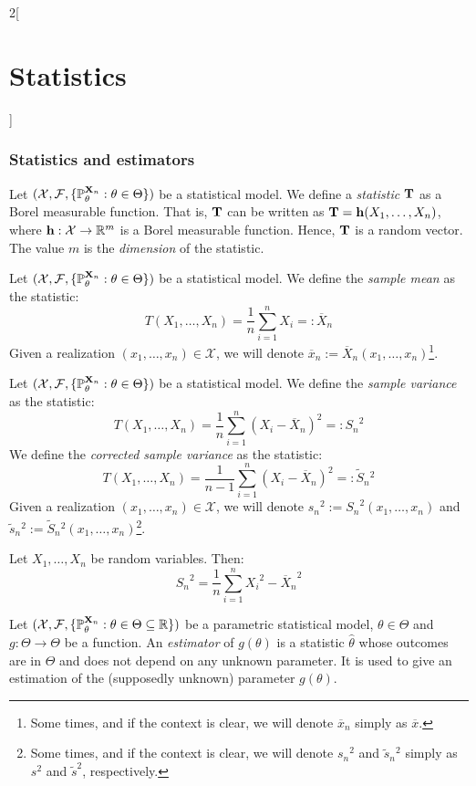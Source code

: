 \documentclass[../../../main_math.tex]{subfiles}
\begin{document}
\begin{multicols}{2}[\section{Statistics}]
  \subsubsection{Statistics and estimators}
  \begin{definition}[Statistic]
    Let $(\mathcal{X},\mathcal{F},\{\mathbb{P}_\theta^{\boldsymbol{\mathrm{X}}_n}:\theta\in\Theta\})$ be a statistical model. We define a \emph{statistic} $\boldsymbol{\mathrm{T}}$ as a Borel measurable function. That is, $\boldsymbol{\mathrm{T}}$ can be written as $\boldsymbol{\mathrm{T}}=\boldsymbol{\mathrm{h}}(X_1,\ldots,X_n)$, where $\boldsymbol{\mathrm{h}}:\mathcal{X}\rightarrow\mathbb{R}^m$ is a Borel measurable function. Hence, $\boldsymbol{\mathrm{T}}$ is a random vector. The value $m$ is the \emph{dimension} of the statistic.
  \end{definition}
  \begin{definition}
    Let $(\mathcal{X},\mathcal{F},\{\mathbb{P}_\theta^{\boldsymbol{\mathrm{X}}_n}:\theta\in\Theta\})$ be a statistical model. We define the \emph{sample mean} as the statistic: $$T(X_1,\ldots,X_n)=\frac{1}{n}\sum_{i=1}^nX_i=:\overline{X}_n$$
    Given a realization $(x_1,\ldots,x_n)\in\mathcal{X}$, we will denote $\overline{x}_n:=\overline{X}_n(x_1,\ldots,x_n)$\footnote{Some times, and if the context is clear, we will denote $\overline{x}_n$ simply as $\overline{x}$.}.
  \end{definition}
  \begin{definition}
    Let $(\mathcal{X},\mathcal{F},\{\mathbb{P}_\theta^{\boldsymbol{\mathrm{X}}_n}:\theta\in\Theta\})$ be a statistical model. We define the \emph{sample variance} as the statistic: $$T(X_1,\ldots,X_n)=\frac{1}{n}\sum_{i=1}^n{(X_i-\overline{X}_n)}^2=:{S_n}^2$$ We define the \emph{corrected sample variance} as the statistic:
    $$T(X_1,\ldots,X_n)=\frac{1}{n-1}\sum_{i=1}^n{(X_i-\overline{X}_n)}^2=:\tilde{S}_n{}^2$$
    Given a realization $(x_1,\ldots,x_n)\in\mathcal{X}$, we will denote ${s_n}^2:={S_n}^2(x_1,\ldots,x_n)$ and $\tilde{s}_n{}^2:=\tilde{S}_n{}^2(x_1,\ldots,x_n)$\footnote{Some times, and if the context is clear, we will denote ${s_n}^2$ and $\tilde{s}_n{}^2$ simply as $s^2$ and $\tilde{s}^2$, respectively.}.
  \end{definition}
  \begin{proposition}
    Let $X_1,\ldots,X_n$ be random variables. Then: $${S_n}^2=\frac{1}{n}\sum_{i=1}^n{X_i}^2-{\overline{X}_n}^2$$
  \end{proposition}
  \begin{definition}
    Let $(\mathcal{X},\mathcal{F},\{\mathbb{P}_{\theta}^{\boldsymbol{\mathrm{X}}_n}:{\theta}\in\Theta\subseteq \mathbb{R}\})$ be a parametric statistical model, ${\theta} \in\Theta$ and $g:\Theta\rightarrow\Theta$ be a function. An \emph{estimator} of $g({\theta})$ is a statistic ${\hat\theta}$ whose outcomes are in $\Theta$ and does not depend on any unknown parameter. It is used to give an estimation of the (supposedly unknown) parameter $g({\theta})$.
  \end{definition}

\end{multicols}
\end{document}
